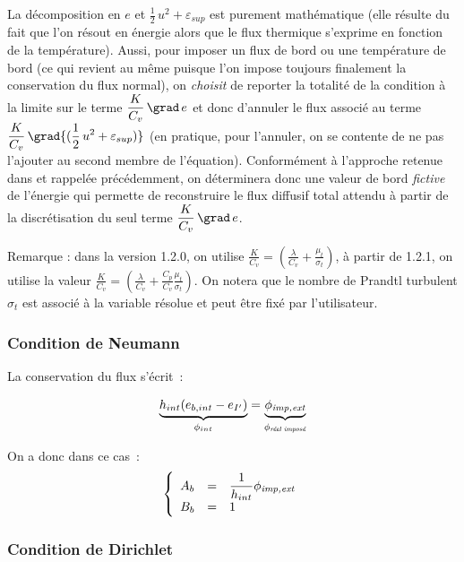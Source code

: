 La décomposition en $e$ et $\frac{1}{2}\,u^2+\varepsilon_{sup}$ est purement
mathématique (elle résulte du fait que l'on résout en énergie alors que
le flux thermique s'exprime en fonction de la température). Aussi,  pour imposer un
flux de bord ou une température de bord (ce qui revient au même puisque l'on
impose toujours finalement la conservation du flux normal), on {\it choisit}
de reporter la totalité de la condition à la limite sur le terme
$\displaystyle\frac{K}{C_v}\,\grad\,e$
et donc d'annuler le flux associé au terme
$\displaystyle\frac{K}{C_v}\,\grad{(\frac{1}{2}\,u^2+\varepsilon_{sup})}$
(en pratique, pour l'annuler, on se contente de ne pas l'ajouter
au second membre de l'équation). Conformément à l'approche retenue dans \CS et
rappelée précédemment, on déterminera donc une valeur de bord {\it
fictive} de l'énergie qui permette de reconstruire le flux diffusif total
attendu à partir
de la discrétisation du seul terme $\displaystyle\frac{K}{C_v}\,\grad\,e$.

Remarque : dans la version 1.2.0,
on utilise $\displaystyle
\frac{K}{C_v}=\left(\frac{\lambda}{C_v}+\frac{\mu_t}{\sigma_t}\right)$, à
partir de 1.2.1, on utilise la valeur  $\displaystyle
\frac{K}{C_v}=\left(\frac{\lambda}{C_v}+\frac{C_p}{C_v}\frac{\mu_t}{\sigma_t}\right)$.
On notera que le nombre de Prandtl turbulent $\sigma_t$ est associé à la variable
résolue et peut être fixé par l'utilisateur.


\subsubsection*{Condition de Neumann}

La conservation du flux s'écrit~:

\begin{equation}
    \underbrace{h_{int}(e_{b,int}-e_{I'})}_{\phi_{int}}
    =\underbrace{\phi_{\text{\it imp,ext}}}_{\phi_{\text{\it réel imposé}}}
\end{equation}

On a donc dans ce cas~:
\begin{equation}
\left\{\begin{array}{lll}
  A_b &= &\displaystyle\frac{1}{h_{int}}\phi_{\text{\it imp,ext}}\\
  B_b &= &1
\end{array}\right.
\end{equation}


\subsubsection*{Condition de Dirichlet}

